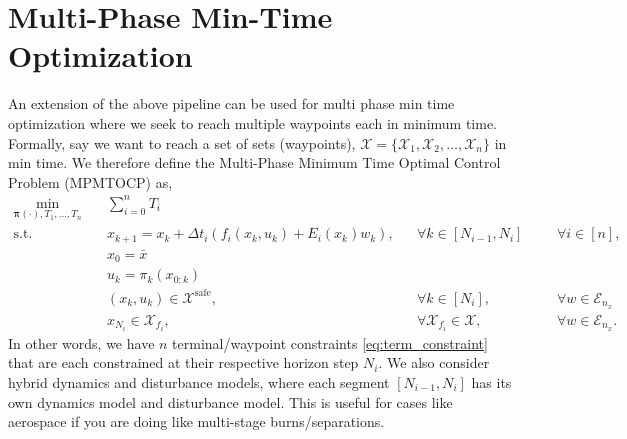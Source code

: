 \documentclass{article}
\begin{document}
\section{Multi-Phase Min-Time Optimization}
An extension of the above pipeline can be used for multi phase min time optimization where we seek to reach multiple waypoints each in minimum time. Formally, say we want to reach a set of sets (waypoints), $\boldsymbol{\mathcal{X}} = \{ \mathcal{X}_1, \mathcal{X}_2, \ldots, \mathcal{X}_n\}$ in min time. We therefore define the Multi-Phase Minimum Time Optimal Control Problem (MPMTOCP) as,
\begin{subequations}
    \begin{align}
        \min_{\mathbf{\pi}(\cdot), T_1, \ldots, T_n} \quad & \sum_{i=0}^n T_i \\
        \text{s.t.} \quad &  x_{k+1} = x_k + \Delta t_i \left(f_i(x_k, u_k) + E_i(x_k)w_k \right), && \forall k \in [N_{i-1}, N_i] &&& \forall i \in [n],\\
        & x_0 = \bar{x} \\
        & u_k = \pi_k(x_{0:k}) \\
        & (x_k, u_k) \in \mathcal{X}^\text{safe}, && \forall k \in [N_i], &&& \forall w \in \mathcal{E}_{n_x} \\
        & x_{N_i} \in \mathcal{X}_{f_i}, && \forall \mathcal{X}_{f_i} \in \boldsymbol{\mathcal{X}}, &&& \forall w \in \mathcal{E}_{n_x} \label{eq:term_constraint}.
    \end{align}
\end{subequations}
In other words, we have $n$ terminal/waypoint constraints \eqref{eq:term_constraint} that are each constrained at their respective horizon step $N_i$. We also consider hybrid dynamics and disturbance models, where each segment $[N_{i-1}, N_i]$ has its own dynamics model and disturbance model. This is useful for cases like aerospace if you are doing like multi-stage burns/separations.
\end{document}
